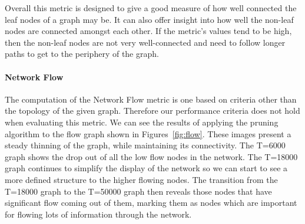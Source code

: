 Overall this metric is designed to give a good measure of how well connected the leaf nodes of a graph may be.  It can also offer insight into how well the non-leaf nodes are connected amongst each other. If the metric's values tend to be high, then the non-leaf nodes are not very well-connected and need to follow longer paths to get to the periphery of the graph.

\paragraph*{Network Flow}
The computation of the Network Flow metric is one based on criteria other than the topology of the given graph.  Therefore our performance criteria does not hold when evaluating this metric.  We can see the results of applying the pruning algorithm to the flow graph shown in Figures~\ref{fig:flow}.  These images present a steady thinning of the graph, while maintaining its connectivity. The T=6000 graph shows the drop out of all the low flow nodes in the network. The T=18000 graph continues to simplify the display of the network so we can start to see a more defined structure to the higher flowing nodes.  The transition from the T=18000 graph to the T=50000 graph then reveals those nodes that have significant flow coming out of them, marking them as nodes which are important for flowing lots of information through the network.

